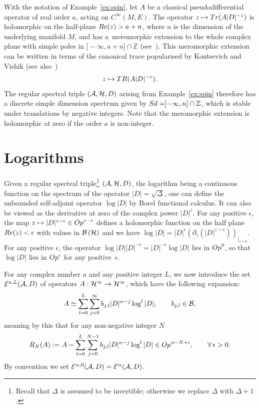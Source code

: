 \documentclass[11pt]{article}
\def \Z {\mathbb Z}
\def \e {{\epsilon}}
\def \Ci {{C^\infty}}
\numberwithin{equation}{section}
\begin{document}
\begin{example} With the notation of   Example~\ref{ex:spin}, let $A$ be a
  classical pseudodif\/ferential operator of real order $a$, acting on
  $\Ci(M, E)$. The operator $z\mapsto {\rm Tr}(A  \vert
   D\vert^{-z})$  is holomorphic on  the half-plane ${\rm Re}(z)>a+n$, where
   $n$ is the dimension of the underlying manifold $M$, and has a~meromorphic
   extension to the whole complex plane with simple poles  in $]{-}\infty,
   a+n]\cap \Z$ (see~\cite{Se}).   This meromorphic extension can be written
   in terms of the canonical trace popularised by Kontsevich and Vishik \cite{KV} (see also~\cite{L})
   \[
   z\mapsto {\rm TR}(A  \vert    D\vert^{-z}).
   \]   The regular spectral triple $\left({\cal A}, {\cal H}, D\right)$
 arising from  Example~\ref{ex:spin}
 therefore has a  discrete simple dimension spectrum given by
  ${\rm Sd}= ]{-}\infty, n]\cap \Z$, which  is stable
under translations by negative integers. Note that the meromorphic extension is
holomorphic at zero if the order $a$ is non-integer.
\end{example}


\section{Logarithms}\label{section3}

Given a regular spectral triple\footnote{Recall that $\Delta$ is assumed to be
  invertible; otherwise we replace $\Delta$ with $\Delta+1$.}
$({\cal A}, {\cal H}, D)$,    the logarithm being a continuous
  function on the spectrum of the
operator
$\vert D\vert=\sqrt{\Delta}$,  one can
def\/ine the
unbounded self-adjoint operator $\log \vert D\vert$ by Borel functional
 calculus. It can  also be viewed as
the derivative at zero of the complex power $\vert D\vert^z$.  For any positive $\e$, the map  $z\mapsto \vert D\vert^{z-\e}\in {\rm Op}^{z-\e}$
 def\/ines a holomorphic  function on the half plane ${\rm Re}(z)<\e$ with
values  in ${\cal B}\left({\cal H}\right)$ and we have
$\log \vert D\vert =\vert D\vert^{\e}
 \left(\partial_z \left( \vert D\vert^{z-\e}\right)\right)_{\vert_{z=0}}
 $.
For any positive $\e$, the operator $ \log \vert D\vert   \vert D\vert^{-\e}=
\vert D\vert^{-\e}  \log \vert D\vert$ lies in   ${\rm Op}^0$, so that   $\log
\vert D\vert$ lies  in ${\rm Op}^\e$ for any positive~$\e$.


 For any complex number $a$ and any positive integer $L$,  we now introduce
 the set
${\cal E}^{a, L}({\cal A}, D) $   of
operators $A:{\cal H}^\infty\to {\cal H}^\infty$, which have the following expansion:
\[
A\simeq \sum_{l=0}^L\sum_{j=0}^\infty b_{j,l} \vert D\vert^{\alpha-j}  \log^l \vert D\vert, \qquad b_{j, l}\in {\cal
  B},
  \]
   meaning by this that for any non-negative integer $N$
\[
R_N(A):=A-\sum_{l=0}^L\sum_{j=0}^{N-1}  b_{j,l} \vert D\vert^{\alpha-j}  \log^l \vert D\vert  \in {\rm  Op}^{\alpha -N+\e}, \qquad\forall \,  \e>0.
\]
By convention we set  ${\cal E}^{\alpha, 0}({\cal A}, D)=
 {\cal E}^\alpha({\cal A}, D)$.
\end{document}
